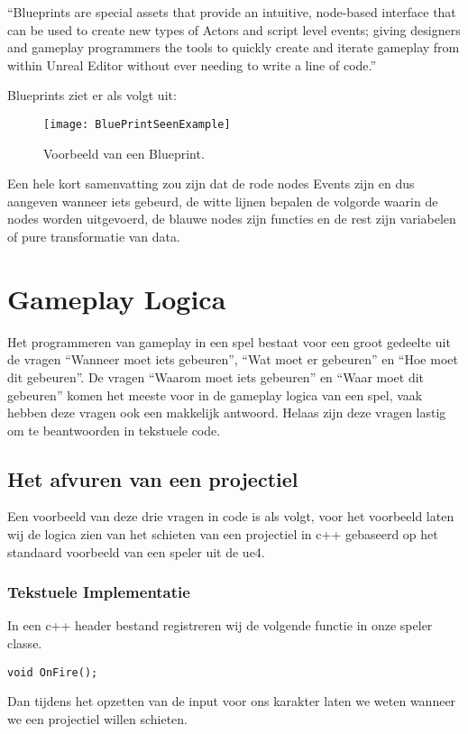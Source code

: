 “Blueprints are special assets that provide an intuitive, node-based interface that can be used to create new types of Actors and script level events; giving designers and gameplay programmers the tools to quickly create and iterate gameplay from within Unreal Editor without ever needing to write a line of code.”

Blueprints ziet er als volgt uit:

\begin{figure}[H]
  \centering
    \texttt{[image: BluePrintSeenExample]}
    \caption{Voorbeeld van een Blueprint.}
\end{figure}

Een hele kort samenvatting zou zijn dat de rode nodes Events zijn en dus aangeven wanneer iets gebeurd, de witte lijnen bepalen de volgorde waarin de nodes worden uitgevoerd, de blauwe nodes zijn functies en de rest zijn variabelen of pure transformatie van data.

\section{Gameplay Logica}
Het programmeren van gameplay in een spel bestaat voor een groot gedeelte uit de vragen “Wanneer moet iets gebeuren”, “Wat moet er gebeuren” en “Hoe moet dit gebeuren”.
De vragen “Waarom moet iets gebeuren” en “Waar moet dit gebeuren” komen het meeste voor in de gameplay logica van een spel, vaak hebben deze vragen ook een makkelijk antwoord. Helaas zijn deze vragen lastig om te beantwoorden in tekstuele code.

\subsection{Het afvuren van een projectiel}
Een voorbeeld van deze drie vragen in code is als volgt, voor het voorbeeld laten wij de logica zien van het schieten van een projectiel in c++ gebaseerd op het standaard voorbeeld van een speler uit de \gls{ue4}.

\subsubsection{Tekstuele Implementatie}
In een c++ header bestand registreren wij de volgende functie in onze speler classe.
\begin{lstlisting}[caption=Registratie van de OnFire functie]
void OnFire();
\end{lstlisting}
Dan tijdens het opzetten van de input voor ons karakter laten we weten wanneer we een projectiel willen schieten.

